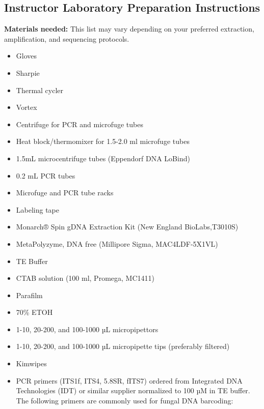 \documentclass[
  letterpaper,
  DIV=11,
  numbers=noendperiod]{scrreprt}
\providecommand{\tightlist}{%
  \setlength{\itemsep}{0pt}\setlength{\parskip}{0pt}}
\begin{document}

\subsection*{Instructor Laboratory Preparation
Instructions}\label{instructor-laboratory-preparation-instructions-3}

\textbf{Materials needed:} This list may vary depending on your
preferred extraction, amplification, and sequencing protocols.

\begin{itemize}
\tightlist
\item
  Gloves
\item
  Sharpie
\item
  Thermal cycler
\item
  Vortex
\item
  Centrifuge for PCR and microfuge tubes
\item
  Heat block/thermomixer for 1.5-2.0 ml microfuge tubes
\item
  1.5mL microcentrifuge tubes (Eppendorf DNA LoBind)
\item
  0.2 mL PCR tubes
\item
  Microfuge and PCR tube racks
\item
  Labeling tape
\item
  Monarch® Spin gDNA Extraction Kit (New England BioLabs,T3010S)
\item
  MetaPolyzyme, DNA free (Millipore Sigma, MAC4LDF-5X1VL)
\item
  TE Buffer
\item
  CTAB solution (100 ml, Promega, MC1411)
\item
  Parafilm
\item
  70\% ETOH
\item
  1-10, 20-200, and 100-1000 µL micropipettors
\item
  1-10, 20-200, and 100-1000 µL micropipette tips (preferably filtered)
\item
  Kimwipes
\item
  PCR primers (ITS1f, ITS4, 5.8SR, fITS7) ordered from Integrated DNA
  Technologies (IDT) or similar supplier normalized to 100 µM in TE
  buffer. The following primers are commonly used for fungal DNA
  barcoding:


\end{itemize}
\end{document}
